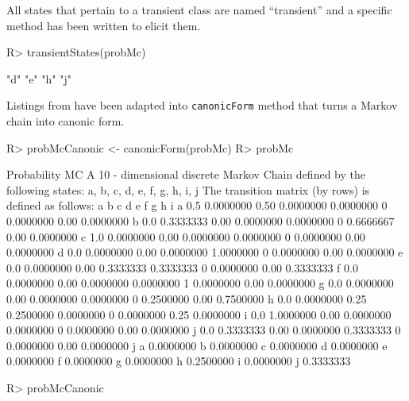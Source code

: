 \documentclass[article,nojss]{jss}
\begin{document}
All states that pertain to a transient class are named ``transient'' and a
specific method has been written to elicit them.

\begin{CodeChunk}

\begin{CodeInput}
R> transientStates(probMc)
\end{CodeInput}

\begin{CodeOutput}
[1] "d" "e" "h" "j"
\end{CodeOutput}
\end{CodeChunk}

Listings from \cite{renaldoMatlab} have been adapted into \texttt{canonicForm} method that turns a Markov chain into canonic form.

\begin{CodeChunk}

\begin{CodeInput}
R> probMcCanonic <- canonicForm(probMc)
R> probMc
\end{CodeInput}

\begin{CodeOutput}
Probability MC 
 A  10 - dimensional discrete Markov Chain defined by the following states: 
 a, b, c, d, e, f, g, h, i, j 
 The transition matrix  (by rows)  is defined as follows: 
    a         b    c         d         e f         g    h         i
a 0.5 0.0000000 0.50 0.0000000 0.0000000 0 0.0000000 0.00 0.0000000
b 0.0 0.3333333 0.00 0.0000000 0.0000000 0 0.6666667 0.00 0.0000000
c 1.0 0.0000000 0.00 0.0000000 0.0000000 0 0.0000000 0.00 0.0000000
d 0.0 0.0000000 0.00 0.0000000 1.0000000 0 0.0000000 0.00 0.0000000
e 0.0 0.0000000 0.00 0.3333333 0.3333333 0 0.0000000 0.00 0.3333333
f 0.0 0.0000000 0.00 0.0000000 0.0000000 1 0.0000000 0.00 0.0000000
g 0.0 0.0000000 0.00 0.0000000 0.0000000 0 0.2500000 0.00 0.7500000
h 0.0 0.0000000 0.25 0.2500000 0.0000000 0 0.0000000 0.25 0.0000000
i 0.0 1.0000000 0.00 0.0000000 0.0000000 0 0.0000000 0.00 0.0000000
j 0.0 0.3333333 0.00 0.0000000 0.3333333 0 0.0000000 0.00 0.0000000
          j
a 0.0000000
b 0.0000000
c 0.0000000
d 0.0000000
e 0.0000000
f 0.0000000
g 0.0000000
h 0.2500000
i 0.0000000
j 0.3333333
\end{CodeOutput}

\begin{CodeInput}
R> probMcCanonic
\end{CodeInput}


\end{CodeChunk}
\end{document}
